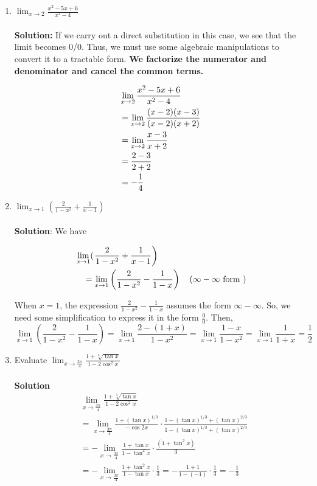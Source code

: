 \begin{enumerate}
    \item $\lim_{x\to 2} \frac{x^2-5x+6}{x^2-4}$\\\\
    \textbf{Solution:}
    If we carry out a direct substitution in this case, we see that the limit becomes 0/0. Thus, we must use some algebraic manipulations to convert it to a tractable form. \textbf{We factorize the numerator and denominator and cancel the common terms.}

    \begin{align}
        & \lim_{x\to 2} \frac{x^2-5x+6}{x^2-4} \notag \\
        & =\lim_{x\to 2}  \frac{(x-2)(x-3)}{(x-2)(x+2)} \notag \\
        & =\lim_{x\to 2} \frac{x-3}{x+2} \notag \\
        & =\frac{2-3}{2+2} \notag \\
        & =-\frac{1}{4} \notag 
     \end{align}

     \item$\lim _{x \rightarrow 1}\left(\frac{2}{1-x^2}+\frac{1}{x-1}\right)$\\\\
\textbf{Solution}: We have

\begin{align}
& \lim _{x \rightarrow 1}(  \left.\frac{2}{1-x^2}+\frac{1}{x-1}\right) \notag \\
& \quad=\lim _{x \rightarrow 1}\left(\frac{2}{1-x^2}-\frac{1}{1-x}\right) \quad (\infty-\infty \text { form }) \notag 
\end{align}


When $x=1$, the expression $\frac{2}{1-x^2}-\frac{1}{1-x}$ assumes the form $\infty-\infty$. So, we need some simplification to express it in the form $\frac{0}{0}$. Then,
$$
\lim _{x \rightarrow 1}\left(\frac{2}{1-x^2}-\frac{1}{1-x}\right)=\lim _{x \rightarrow 1} \frac{2-(1+x)}{1-x^2}=\lim _{x \rightarrow 1} \frac{1-x}{1-x^2}=\lim _{x \rightarrow 1} \frac{1}{1+x}=\frac{1}{2}
$$


\item Evaluate $\lim _{x \rightarrow \frac{3 \pi}{4}} \frac{1+\sqrt[3]{\tan x}}{1-2 \cos ^2 x}$\\\\
\textbf{Solution}
$$
\begin{aligned}
& \lim _{x \rightarrow \frac{3 \pi}{4}} \frac{1+\sqrt[3]{\tan x}}{1-2 \cos ^2 x} \\
& =\lim _{x \rightarrow \frac{3 \pi}{4}} \frac{1+(\tan x)^{1 / 3}}{-\cos 2 x} \cdot \frac{1-(\tan x)^{1 / 3}+(\tan x)^{2 / 3}}{1-(\tan x)^{1 / 3}+(\tan x)^{2 / 3}} \\
& =-\lim _{x \rightarrow \frac{3 \pi}{4}} \frac{1+\tan x}{1-\tan ^2 x} \cdot \frac{(1+\tan ^2 x)}{3} \\
& =-\lim _{x \rightarrow \frac{3 \pi}{4}} \frac{1+\tan ^2 x}{1-\tan x} \cdot \frac{1}{3}=-\frac{1+1}{1-(-1)} \cdot \frac{1}{3}=-\frac{1}{3}
\end{aligned}
$$


\end{enumerate}
